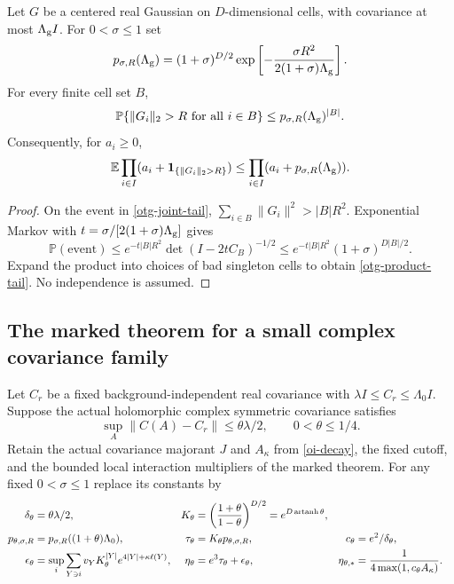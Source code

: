 \begin{lemma}\label{otg-tail-lemma}
Let $G$ be a centered real Gaussian on $D$-dimensional cells, with
covariance at most $\Lambda_{\rm g} I$. For $0<\sigma\le1$ set
\begin{equation}\label{otg-tail-constant}
 p_{\sigma,R}(\Lambda_{\rm g})
  =(1+\sigma)^{D/2}
             \exp\left[-\frac{\sigma R^2}{2(1+\sigma)\Lambda_{\rm g}}\right].
\end{equation}
For every finite cell set $B$,
\begin{equation}\label{otg-joint-tail}
 \mathbb P\{\|G_i\|_2>R\text{ for all }i\in B\}
                   \le p_{\sigma,R}(\Lambda_{\rm g})^{|B|}.
\end{equation}
Consequently, for $a_i\ge0$,
\begin{equation}\label{otg-product-tail}
 \mathbb E\prod_{i\in I}
            (a_i+\mathbf1_{\{\|G_i\|_2>R\}})
                  \le\prod_{i\in I}(a_i+p_{\sigma,R}(\Lambda_{\rm g})).
\end{equation}
\end{lemma}
\begin{proof}
On the event in \eqref{otg-joint-tail},
$\sum_{i\in B}\|G_i\|^2>|B|R^2$.
Exponential Markov with
$t=\sigma/[2(1+\sigma)\Lambda_{\rm g}]$ gives
\[
 \mathbb P(\text{event})
 \le e^{-t|B|R^2}\det(I-2tC_B)^{-1/2}
 \le e^{-t|B|R^2}(1+\sigma)^{D|B|/2}.
\]
Expand the product into choices of bad singleton cells to
obtain \eqref{otg-product-tail}. No independence is assumed.
\end{proof}

\subsection{The marked theorem for a small complex covariance family}

Let $C_r$ be a fixed background-independent real covariance with
$\lambda I\le C_r\le\Lambda_0 I$. Suppose the actual holomorphic
complex symmetric covariance satisfies
\begin{equation}\label{otg-close}
 \sup_A\|C(A)-C_r\|\le\theta\lambda/2,\qquad
                                  0<\theta\le1/4.
\end{equation}
Retain the actual covariance majorant $J$ and $A_\kappa$
from \eqref{oi-decay}, the fixed cutoff, and the bounded local
interaction multipliers of the marked theorem.
For any fixed $0<\sigma\le1$ replace its constants by
\begin{align}
 \delta_\theta&=\theta\lambda/2,&
 K_\theta&=\left(\frac{1+\theta}{1-\theta}\right)^{D/2}
                     =e^{D\operatorname{artanh}\theta},\notag\\
 p_{\theta,\sigma,R}
       &=p_{\sigma,R}((1+\theta)\Lambda_0),&
 \tau_\theta&=K_\theta p_{\theta,\sigma,R},&
 c_\theta&=e^2/\delta_\theta,\notag\\
 \epsilon_\theta&=\sup_i\sum_{Y\ni i}
       v_YK_\theta^{|Y|}e^{4|Y|+\kappa\ell(Y)},&
 \eta_\theta&=e^3\tau_\theta+\epsilon_\theta,&
 \eta_{\theta,*}&=\frac1{4\max(1,c_\theta A_\kappa)}.
                                                        \label{otg-mark-constants}
\end{align}

